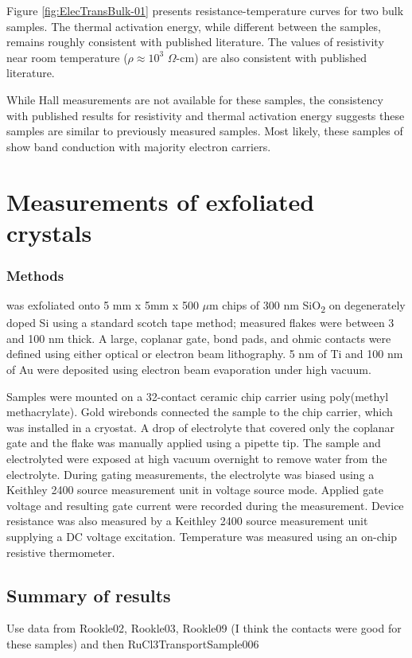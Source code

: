 Figure \ref{fig:ElecTransBulk-01} presents resistance-temperature curves for two bulk \rucl samples. The thermal activation energy, while different between the samples, remains roughly consistent with published literature. The values of resistivity near room temperature ($\rho \approx 10^{3}$ $\Omega$-cm) are also consistent with published literature.

While Hall measurements are not available for these samples, the consistency with published results for resistivity and thermal activation energy suggests these samples are similar to previously measured samples. Most likely, these samples of \rucl show band conduction with majority electron carriers.

\section{Measurements of exfoliated \texorpdfstring{\rucl}{RuCl3}crystals}

\subsubsection{Methods}
\rucl was exfoliated onto 5 mm x 5mm x 500 $\mu$m chips of 300 nm SiO\textsubscript{2} on degenerately doped Si using a standard scotch tape method; measured \rucl flakes were between 3 and 100 nm thick. A large, coplanar gate, bond pads, and ohmic contacts were defined using either optical or electron beam lithography. 5 nm of Ti and 100 nm of Au were deposited using electron beam evaporation under high vacuum.

Samples were mounted on a 32-contact ceramic chip carrier using poly(methyl methacrylate). Gold wirebonds connected the sample to the chip carrier, which was installed in a cryostat. A drop of electrolyte that covered only the coplanar gate and the \rucl flake was manually applied using a pipette tip. The sample and electrolyted were exposed at high vacuum overnight to remove water from the electrolyte. During gating measurements, the electrolyte was biased using a Keithley 2400 source measurement unit in voltage source mode. Applied gate voltage and resulting gate current were recorded during the measurement. Device resistance was also measured by a Keithley 2400 source measurement unit supplying a DC voltage excitation. Temperature was measured using an on-chip resistive thermometer.

\subsection{Summary of results}

Use data from Rookle02, Rookle03, Rookle09 (I think the contacts were good for these samples) and then RuCl3TransportSample006